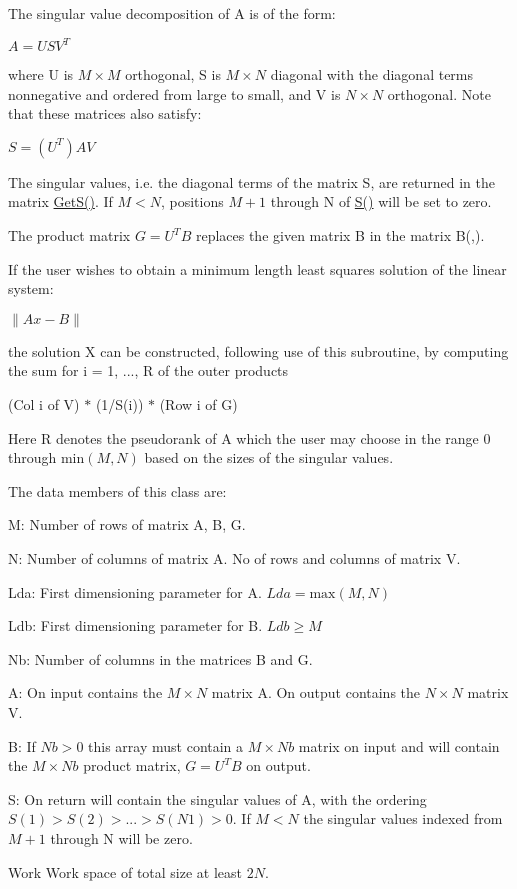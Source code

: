 The singular value decomposition of A is of the form\-:

$ A = U S V^{T} $

where U is $ M \times M $ orthogonal, S is $ M \times N $ diagonal with the diagonal terms nonnegative and ordered from large to small, and V is $ N \times N $ orthogonal. Note that these matrices also satisfy\-:

$ S = (U^{T}) A V $

The singular values, i.\-e. the diagonal terms of the matrix S, are returned in the matrix \hyperlink{classnmr_s_v_d_r_s_solver_ac73c09c7becbece05b4d1e1230b5049f}{Get\-S()}. If $ M < N $, positions $ M+1 $ through N of \hyperlink{classnmr_s_v_d_r_s_solver_a7ec50f8b0ef442501f1c0b866f337474}{S()} will be set to zero.

The product matrix $ G = U^{T} B $ replaces the given matrix B in the matrix B(,).

If the user wishes to obtain a minimum length least squares solution of the linear system\-:

$ \| Ax - B \| $

the solution X can be constructed, following use of this subroutine, by computing the sum for i = 1, ..., R of the outer products

(Col i of V) $\ast$ (1/\-S(i)) $\ast$ (Row i of G)

Here R denotes the pseudorank of A which the user may choose in the range 0 through $ \mbox{min}(M, N) $ based on the sizes of the singular values.

The data members of this class are\-:


\begin{DoxyItemize}
\item M\-: Number of rows of matrix A, B, G.
\item N\-: Number of columns of matrix A. No of rows and columns of matrix V.
\item Lda\-: First dimensioning parameter for A. $ Lda = \mbox{max}(M,N) $
\item Ldb\-: First dimensioning parameter for B. $ Ldb \geq M $
\item Nb\-: Number of columns in the matrices B and G.
\item A\-: On input contains the $ M \times N $ matrix A. On output contains the $ N \times N $ matrix V.
\item B\-: If $ Nb > 0 $ this array must contain a $ M \times Nb $ matrix on input and will contain the $ M \times Nb $ product matrix, $ G = U^{T} B $ on output.
\item S\-: On return will contain the singular values of A, with the ordering $ S(1) > S(2) > ... > S(N1) > 0 $. If $ M < N $ the singular values indexed from $ M+1 $ through N will be zero.
\item Work Work space of total size at least $ 2N $.
\end{DoxyItemize}

